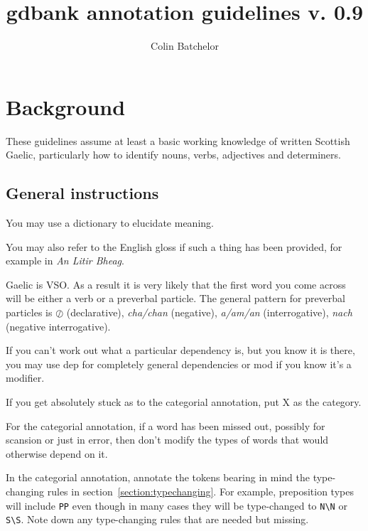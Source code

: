 \documentclass[a4paper]{article}
\begin{document}
\title{gdbank annotation guidelines v. 0.9}
\author{Colin Batchelor}
\maketitle

\tableofcontents

\section{Background}

These guidelines assume at least a basic working knowledge of written Scottish Gaelic, particularly how to identify nouns, verbs, adjectives and determiners.

\subsection{General instructions}

 You may use a dictionary to elucidate meaning.

 You may also refer to the English gloss if such a thing has been provided, for example in {\it An Litir Bheag}.

 Gaelic is VSO. As a result it is very likely that the first word you come across will be either a verb or a preverbal particle.
The general pattern for preverbal particles is $\oslash$ (declarative), \textit{cha/chan} (negative), \textit{a/am/an} (interrogative), \textit{nach} (negative interrogative).

 If you can't work out what a particular dependency is, but you know it is there, you may use dep for completely general dependencies or mod if you know it's a modifier.

 If you get absolutely stuck as to the categorial annotation, put X as the category.

 For the categorial annotation, if a word has been missed out, possibly for scansion or just in error, then don't modify the types of words that would otherwise depend on it.

 In the categorial annotation, annotate the tokens bearing in mind the type-changing rules in section~\ref{section:typechanging}. For example, preposition types will include \texttt{PP} even though in many cases they will be type-changed to \texttt{N\textbackslash N} or \texttt{S\textbackslash S}. Note down any type-changing rules that are needed but missing.
\end{document}
